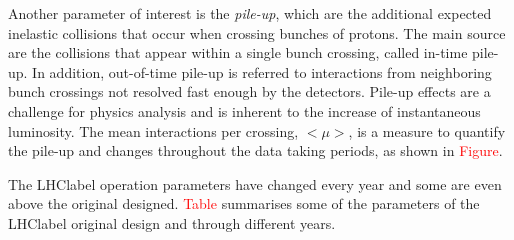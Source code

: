 Another parameter of interest is the \textit{pile-up}, which are the additional expected inelastic collisions that occur when crossing bunches of protons. The main source are the collisions that appear within a single bunch crossing, called in-time pile-up. In addition, out-of-time pile-up is referred to interactions from neighboring bunch crossings not resolved fast enough by the detectors. Pile-up effects are a challenge for physics analysis and is inherent to the increase of instantaneous luminosity. The mean interactions per crossing, $<\mu>$, is a measure to quantify the pile-up and changes throughout the data taking periods, as shown in \textcolor{red}{Figure}.

The \acrshort{LHClabel} operation parameters have changed every year and some are even above the original designed. \textcolor{red}{Table} summarises some of the parameters of the \acrshort{LHClabel} original design and through different years. 


